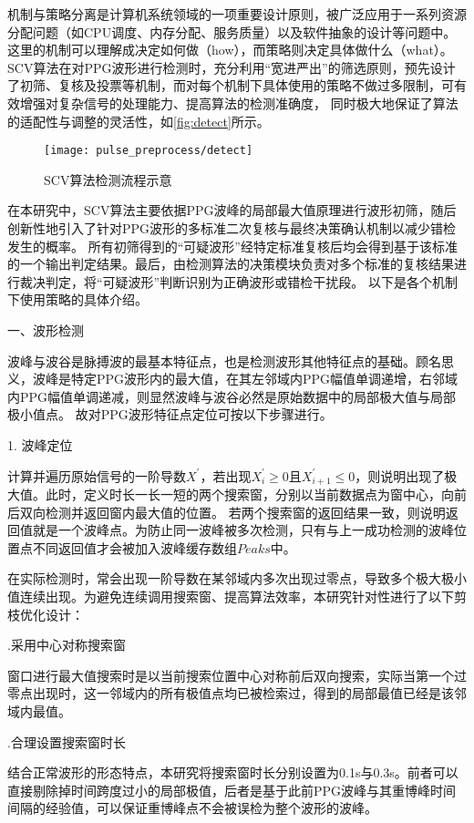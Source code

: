 机制与策略分离是计算机系统领域的一项重要设计原则，被广泛应用于一系列资源分配问题（如CPU调度、内存分配、服务质量）以及软件抽象的设计等问题中\cite{Wulf1974,Levin1975,Brinch2001}。
这里的机制可以理解成决定如何做（how），而策略则决定具体做什么（what）。
SCV算法在对PPG波形进行检测时，充分利用“宽进严出”的筛选原则，预先设计了初筛、复核及投票等机制，而对每个机制下具体使用的策略不做过多限制，可有效增强对复杂信号的处理能力、提高算法的检测准确度，
同时极大地保证了算法的适配性与调整的灵活性，如\autoref{fig:detect}所示。
\begin{figure}[htbp]
    \centering
    \texttt{[image: pulse\_preprocess/detect]}
    \caption{\label{fig:detect}SCV算法检测流程示意}
\end{figure}

在本研究中，SCV算法主要依据PPG波峰的局部最大值原理进行波形初筛，随后创新性地引入了针对PPG波形的多标准二次复核与最终决策确认机制以减少错检发生的概率。
所有初筛得到的“可疑波形”经特定标准复核后均会得到基于该标准的一个输出判定结果。最后，由检测算法的决策模块负责对多个标准的复核结果进行裁决判定，将“可疑波形”判断识别为正确波形或错检干扰段。
以下是各个机制下使用策略的具体介绍。

一、波形检测

波峰与波谷是脉搏波的最基本特征点，也是检测波形其他特征点的基础。顾名思义，波峰是特定PPG波形内的最大值，在其左邻域内PPG幅值单调递增，右邻域内PPG幅值单调递减，则显然波峰与波谷必然是原始数据中的局部极大值与局部极小值点。
故对PPG波形特征点定位可按以下步骤进行。

1. 波峰定位

计算并遍历原始信号的一阶导数$X^{'}$，若出现$X_i^{'}\ge 0$且$X_{i+1}^{'}\le 0$，则说明出现了极大值。此时，定义时长一长一短的两个搜索窗，分别以当前数据点为窗中心，向前后双向检测并返回窗内最大值的位置。
若两个搜索窗的返回结果一致，则说明返回值就是一个波峰点。为防止同一波峰被多次检测，只有与上一成功检测的波峰位置点不同返回值才会被加入波峰缓存数组$Peaks$中。

在实际检测时，常会出现一阶导数在某邻域内多次出现过零点，导致多个极大极小值连续出现。为避免连续调用搜索窗、提高算法效率，本研究针对性进行了以下剪枝优化设计：

.采用中心对称搜索窗

窗口进行最大值搜索时是以当前搜索位置中心对称前后双向搜索，实际当第一个过零点出现时，这一邻域内的所有极值点均已被检索过，得到的局部最值已经是该邻域内最值。

.合理设置搜索窗时长

结合正常波形的形态特点，本研究将搜索窗时长分别设置为0.1s与0.3s。前者可以直接剔除掉时间跨度过小的局部极值，后者是基于此前PPG波峰与其重博峰时间间隔的经验值，可以保证重博峰点不会被误检为整个波形的波峰。

